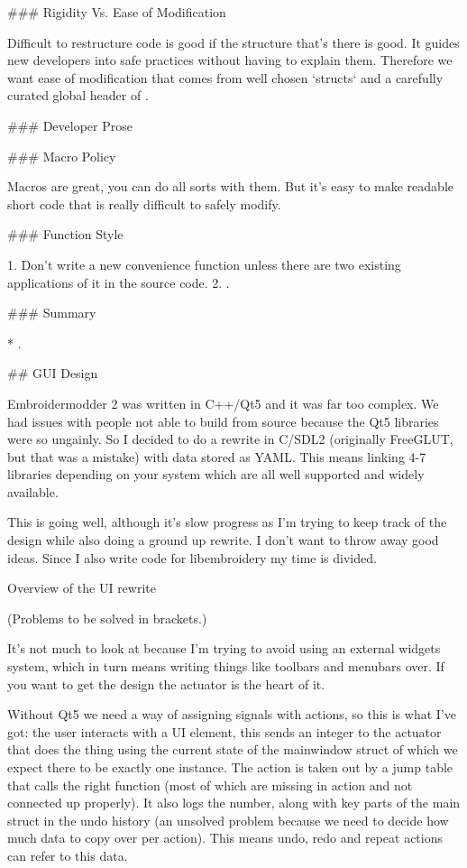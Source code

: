 ### Rigidity Vs. Ease of Modification

Difficult to restructure code is good if the structure that's there is good.
It guides new developers into safe practices without having to explain them.
Therefore we want ease of modification that comes from well chosen `structs`
and a carefully curated global header of .

### Developer Prose

### Macro Policy

Macros are great, you can do all sorts with them. But it's easy to make readable
short code that is really difficult to safely modify.

### Function Style

1. Don't write a new convenience function unless there are two existing applications of it in the source code.
2. .

### Summary

* .

## GUI Design


Embroidermodder 2 was written in C++/Qt5 and it was far too complex. We had
issues with people not able to build from source because the Qt5 libraries were
so ungainly. So I decided to do a rewrite in C/SDL2 (originally FreeGLUT, but
that was a mistake) with data stored as YAML. This means linking 4-7 libraries
depending on your system which are all well supported and widely available.

This is going well, although it's slow progress as I'm trying to keep track of
the design while also doing a ground up rewrite. I don't want to throw away good
ideas. Since I also write code for libembroidery my time is divided.

Overview of the UI rewrite

(Problems to be solved in brackets.)

It's not much to look at because I'm trying to avoid using an external
widgets system, which in turn means writing things like toolbars and menubars
over. If you want to get the design the actuator is the heart of it.

Without Qt5 we need a way of assigning signals with actions, so this is what
I've got: the user interacts with a UI element, this sends an integer to the
actuator that does the thing using the current state of the mainwindow struct
of which we expect there to be exactly one instance. The action is taken out
by a jump table that calls the right function (most of which are missing in
action and not connected up properly). It also logs the number, along with
key parts of the main struct in the undo history (an unsolved problem because
we need to decide how much data to copy over per action). This means undo,
redo and repeat actions can refer to this data.

